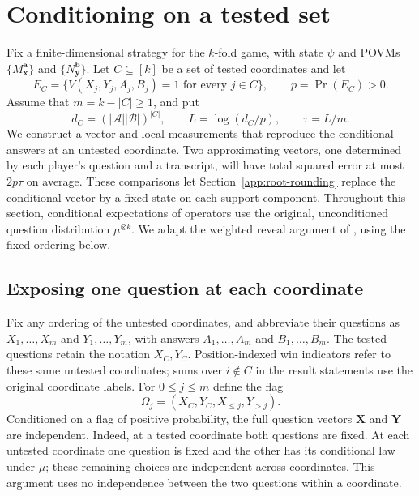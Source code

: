 \section{Conditioning on a tested set}\label{sec:exposure}

Fix a finite-dimensional strategy for the $k$-fold game, with state
$\psi$ and POVMs $\{M_{\mathbf x}^{\mathbf a}\}$ and
$\{N_{\mathbf y}^{\mathbf b}\}$. Let $C\subseteq[k]$ be a set of tested
coordinates and let
\[
 E_C=\{V(X_j,Y_j,A_j,B_j)=1\text{ for every }j\in C\},
 \qquad p=\Pr(E_C)>0.
\]
Assume that $m=k-|C|\ge1$, and put
\begin{equation}\label{eq:conditioning-budget}
 d_C=(|\mathcal A||\mathcal B|)^{|C|},\qquad
 L=\log(d_C/p),\qquad \tau=L/m.
\end{equation}
We construct a vector and local measurements that reproduce the
conditional answers at an untested coordinate. Two approximating vectors,
one determined by each player's question and a transcript, will have
total squared error at most $2p\tau$ on average. These comparisons let
Section~\ref{app:root-rounding} replace the conditional vector by a fixed
state on each support component. Throughout this
section, conditional expectations of operators use the original,
unconditioned question distribution $\mu^{\otimes k}$. We adapt the
weighted reveal argument of \cite[Chapter~6, Section~4]{tenadvances2026},
using the fixed ordering below.

\subsection{Exposing one question at each coordinate}

Fix any ordering of the untested coordinates, and abbreviate their
questions as $X_1,\ldots,X_m$ and $Y_1,\ldots,Y_m$, with answers
$A_1,\ldots,A_m$ and $B_1,\ldots,B_m$. The tested questions
retain the notation $X_C,Y_C$. Position-indexed win indicators refer to
these same untested coordinates; sums over $i\notin C$ in the result
statements use the original coordinate labels. For $0\le j\le m$
define the flag
\[
 \Omega_j=(X_C,Y_C,X_{\le j},Y_{>j}).
\]
Conditioned on a flag of positive probability, the full question vectors
$\mathbf X$ and $\mathbf Y$ are independent. Indeed, at a tested
coordinate both questions are fixed. At each untested coordinate one
question is fixed and the other has its conditional law under $\mu$;
these remaining choices are independent across coordinates. This
argument uses no independence between the two questions within a
coordinate.

